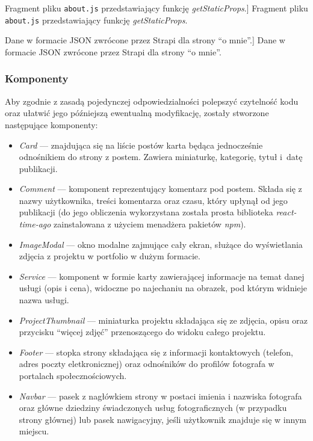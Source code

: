 \documentclass[a4paper, 12pt, twoside]{article}
\numberwithin{figure}{section}
\begin{document}
\begin{sloppypar}
\begin{code}[htbp]
    
    \caption
    [Fragment pliku \texttt{about.js} przedstawiający funkcję \textit{getStaticProps}.]
    {Fragment pliku \texttt{about.js} przedstawiający funkcję \textit{getStaticProps}.}
    \label{chapter4:next_about2.txt}
\end{code}

\begin{code}[htbp]
    
    \caption
    [Dane w formacie JSON zwrócone przez Strapi dla strony ``o mnie''.]
    {Dane w formacie JSON zwrócone przez Strapi dla strony ``o mnie''.}
    \label{chapter4:strapi_response.txt}
\end{code}

\subsubsection*{Komponenty}

Aby zgodnie z zasadą pojedynczej odpowiedzialności \cite{srp} polepszyć czytelność kodu oraz ułatwić jego późniejszą ewentualną modyfikację, zostały stworzone następujące komponenty:
\begin{itemize}
    \item \textit{Card} --- znajdująca się na liście postów karta będąca jednocześnie odnośnikiem do strony z postem. Zawiera miniaturkę, kategorię, tytuł i~datę publikacji.
    \item \textit{Comment} --- komponent reprezentujący komentarz pod postem. Składa się z nazwy użytkownika, treści komentarza oraz czasu, który upłynął od jego publikacji (do jego obliczenia wykorzystana została prosta biblioteka \textit{react-time-ago} zainstalowana z użyciem menadżera pakietów \textit{npm}).
    \item \textit{ImageModal} --- okno modalne zajmujące cały ekran, służące do wyświetlania zdjęcia z projektu w portfolio w dużym formacie.
    \item \textit{Service} --- komponent w formie karty zawierającej informacje na temat danej usługi (opis i cena), widoczne po najechaniu na obrazek, pod którym widnieje nazwa usługi.
    \item \textit{ProjectThumbnail} --- miniaturka projektu składająca się ze zdjęcia, opisu oraz przycisku ``więcej zdjęć'' przenoszącego do widoku całego projektu.
    \item \textit{Footer} --- stopka strony składająca się z informacji kontaktowych (telefon, adres poczty eletkronicznej) oraz odnośników do profilów fotografa w portalach społecznościowych.
    \item \textit{Navbar} --- pasek z nagłówkiem strony w postaci imienia i nazwiska fotografa oraz główne dziedziny świadczonych usług fotograficznych (w przypadku strony głównej) lub pasek nawigacyjny, jeśli użytkownik znajduje się w innym miejscu.
\end{itemize}


\end{sloppypar}
\end{document}
